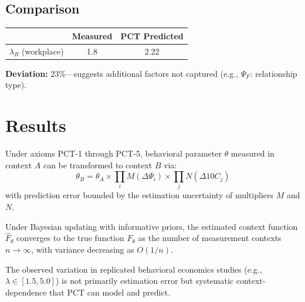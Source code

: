 \subsection{Comparison}

\begin{center}
\begin{tabular}{lcc}
\toprule
& \textbf{Measured} & \textbf{PCT Predicted} \\
\midrule
$\lambda_R$ (workplace) & 1.8 & 2.22 \\
\bottomrule
\end{tabular}
\end{center}

\textbf{Deviation:} 23\%---suggests additional factors not captured (e.g., $\Psi_F$: relationship type).



\section{Results}
\label{sec:pct-results}

\begin{theorem}
\label{thm:pct-main}
Under axioms PCT-1 through PCT-5, behavioral parameter $\theta$ measured in
context $A$ can be transformed to context $B$ via:
\[
\theta_B = \theta_A \times \prod_i M(\Delta\Psi_i) \times \prod_j N(\Delta 10C_j)
\]
with prediction error bounded by the estimation uncertainty of multipliers $M$ and $N$.
\end{theorem}

\begin{corollary}
\label{cor:convergence}
Under Bayesian updating with informative priors, the estimated context function
$\hat{F}_\theta$ converges to the true function $F_\theta$ as the number of
measurement contexts $n \to \infty$, with variance decreasing as $O(1/n)$.
\end{corollary}

\begin{result}
The observed variation in replicated behavioral economics studies (e.g.,
$\lambda \in [1.5, 5.0]$) is not primarily estimation error but systematic
context-dependence that PCT can model and predict.
\end{result}



